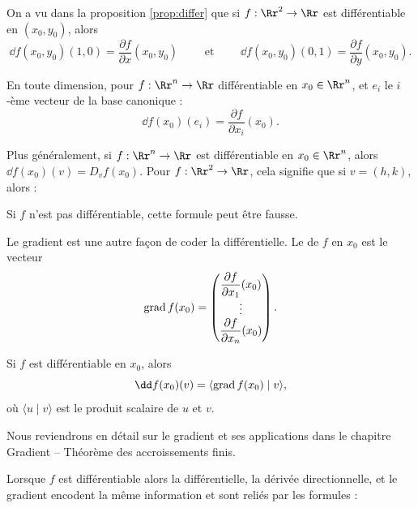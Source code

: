 \documentclass[11pt, class=report,crop=false]{standalone}
\begin{document}
\bigskip
{}

On a vu dans la proposition \ref{prop:differ} que si $f : \Rr^2 \to \Rr$ est différentiable en $(x_0,y_0)$, alors
$$\dd f (x_0,y_0) (1,0) = \frac{\partial f}{\partial x}(x_0,y_0)
\qquad \text{ et } \qquad
\dd f (x_0,y_0) (0,1) = \frac{\partial f}{\partial y}(x_0,y_0).$$

En toute dimension, pour $f : \Rr^n \to \Rr$ différentiable en $x_0 \in \Rr^n$, et $e_i$ le $i$-ème vecteur de la base canonique :
$$\dd f (x_0) (e_i) = \frac{\partial f}{\partial x_i}(x_0).$$



\bigskip
{}

Plus généralement, si $f : \Rr^n \to \Rr$ est différentiable en $x_0 \in \Rr^n$, alors $\dd f (x_0) (v) = D_v f(x_0)$.
Pour $f : \Rr^2 \to \Rr$, cela signifie que si $v=(h,k)$, alors :

Si $f$ n'est pas différentiable, cette formule peut être fausse.

\bigskip
{}

Le gradient est une autre façon de coder la différentielle.
Le  de $f$ en $x_0$ est le vecteur
$$\operatorname{grad} f (x_0) =
\begin{pmatrix}
\dfrac{\partial f}{\partial x_{1}} (x_0)\\
\vdots \\
\dfrac{\partial f}{\partial x_n}(x_0)
\end{pmatrix}.$$

Si $f$ est différentiable en $x_0$, alors
$$\dd f (x_0) (v) = \langle \grad f (x_0) \mid v \rangle,$$
où $\langle u \mid v \rangle$ est le produit scalaire de $u$ et $v$.

Nous reviendrons en détail sur le gradient et ses applications dans le chapitre \og{}Gradient -- Théorème des accroissements finis\fg{}.


\bigskip
{}

Lorsque $f$ est différentiable alors la différentielle, la dérivée directionnelle, et le gradient encodent la même information et sont reliés  
par les formules :
\end{document}
